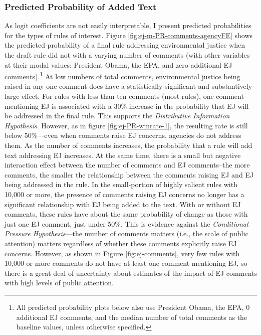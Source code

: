 \documentclass[
      12pt,
        ]{article}
\begin{document}
\hypertarget{predicted-probability-of-added-text}{%
\subsubsection{Predicted Probability of Added Text}\label{predicted-probability-of-added-text}}

As logit coefficients are not easily interpretable, I present
predicted probabilities for the types of rules of interest.
Figure \ref{fig:ej-m-PR-comments-agencyFE} shows the predicted probability of a final rule addressing environmental justice when the draft rule did not with a varying number of comments (with other variables at their modal values: President Obama, the EPA, and zero additional EJ comments).\footnote{All predicted probability plots below also use President Obama, the EPA, 0 additional EJ comments, and the median number of total comments as the baseline values, unless otherwise specified.}
At low numbers of total comments, environmental justice being raised in any one comment does have a
statistically significant and substantively large effect. For rules with less than ten comments (most rules), one comment mentioning EJ is associated with a 30\% increase in the probability that EJ will be addressed in the final rule. This supports the \emph{Distributive Information Hypothesis}. However, as in figure \ref{fig:ej-PR-winrate-1}, the resulting rate is still below 50\%---even when comments raise EJ concerns, agencies do not address them. As the number of comments increases, the probability that a rule will add text addressing EJ increases. At the same time, there is a small but negative interaction effect between the number of comments and EJ comments--the more comments, the smaller the relationship between the comments raising EJ and EJ being addressed in the rule. In the small-portion of highly salient rules with 10,000 or more, the presence of comments raising EJ concerns no longer has a significant relationship with EJ being added to the text. With or without EJ comments, these rules have about the same probability of change as those with just one EJ comment, just under 50\%. This is evidence against the \emph{Conditional Pressure Hypothesis}---the number of comments matters (i.e., the scale of public attention) matters regardless of whether these comments explicitly raise EJ concerns. However, as shown in Figure \ref{fig:ej-comments}, very few rules with 10,000 or more comments do not have at least one comment mentioning EJ, so there is a great deal of uncertainty about estimates of the impact of EJ comments with high levels of public attention.
\end{document}
